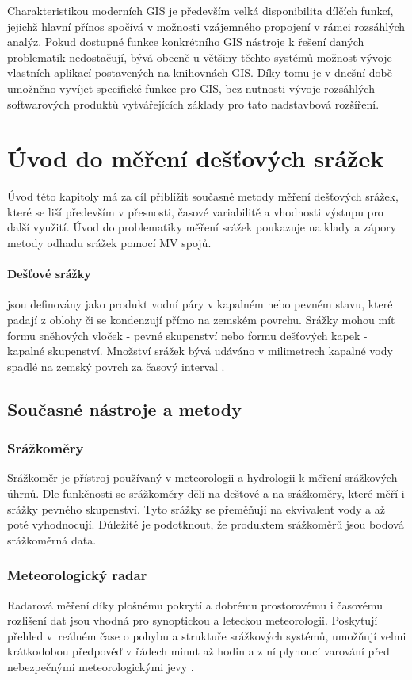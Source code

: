 \documentclass[a4paper,12pt,oneside]{report}
\begin{document}
Charakteristikou moderních GIS je především velká disponibilita
dílčích funkcí, jejichž hlavní přínos spočívá v možnosti vzájemného
propojení v rámci rozsáhlých analýz. Pokud dostupné funkce konkrétního
GIS nástroje k řešení daných problematik nedostačují, bývá obecně u
většiny těchto systémů možnost vývoje vlastních aplikací postavených
na knihovnách GIS. Díky tomu je v dnešní době umožněno vyvíjet
specifické funkce pro GIS, bez nutnosti vývoje rozsáhlých softwarových
produktů vytvářejících základy pro tato nadstavbová rozšíření.



\section{Úvod do měření dešťových srážek}
Úvod této kapitoly má za cíl přiblížit současné metody měření dešťových
srážek, které se liší především v přesnosti, časové variabilitě a
vhodnosti výstupu pro další využití. Úvod do problematiky měření
srážek poukazuje na klady a zápory metody odhadu srážek pomocí MV spojů.


\paragraph*{Dešťové srážky} jsou definovány jako produkt vodní páry v
kapalném nebo pevném stavu, které padají z oblohy či se kondenzují přímo
na zemském povrchu. Srážky mohou mít formu sněhových vloček - pevné
skupenství nebo formu dešťových kapek - kapalné skupenství. Množství
srážek bývá udáváno v milimetrech kapalné vody spadlé na zemský povrch
za časový interval \cite{wmo}.

\subsection{Současné nástroje a metody }
\label{subsec:11}

\subsubsection{Srážkoměry}
Srážkoměr je přístroj používaný v meteorologii a hydrologii k měření
srážkových úhrnů. Dle funkčnosti se srážkoměry dělí na dešťové a na
srážkoměry, které měří i srážky pevného skupenství. Tyto srážky se
přeměňují na ekvivalent vody a až poté vyhodnocují. Důležité je
podotknout, že produktem srážkoměrů jsou bodová srážkoměrná data.

\subsubsection{Meteorologický radar}
Radarová měření díky plošnému pokrytí a dobrému prostorovému i
časovému rozlišení dat jsou vhodná pro synoptickou a leteckou
meteorologii. Poskytují přehled v~reálném čase o pohybu a struktuře
srážkových systémů, umožňují velmi krátkodobou předpověď v řádech
minut až hodin a z ní plynoucí varování před nebezpečnými
meteorologickými jevy \cite{radar_chmu}.
\end{document}
